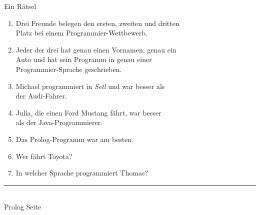 \documentclass{slides}
\newcommand{\myrule}{\rule{20cm}{1mm}\\ }
\newcounter{mypage}
\begin{document}

\begin{slide}{}
\normalsize
\begin{center}
Ein R\"{a}tsel
\end{center}
\vspace{0.5cm}

\footnotesize
\begin{enumerate}
\item Drei Freunde belegen den ersten, zweiten und dritten \\
      Platz bei einem Programmier-Wettbewerb.
\item Jeder der drei hat genau einen Vornamen, genau ein \\
      Auto und hat sein Programm in genau einer \\
      Programmier-Sprache geschrieben.
\item Michael programmiert in \textsl{Setl} und war besser als \\
      der Audi-Fahrer.
\item Julia, die einen Ford Mustang f\"{a}hrt, war besser \\
      als der Java-Programmierer.
\item Das Prolog-Programm war am besten.
\item Wer f\"{a}hrt Toyota?
\item In welcher Sprache programmiert Thomas?
\end{enumerate}



\vspace*{\fill}
\tiny \addtocounter{mypage}{1}
\myrule
Prolog  \hspace*{\fill} Seite 
\end{slide}

\end{document}
